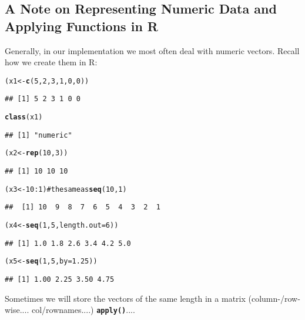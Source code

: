 \documentclass[11pt]{article}\usepackage{graphicx, color}
\makeatletter
\newcommand{\hlfunctioncall}[1]{\textcolor[rgb]{0.501960784313725,0,0.329411764705882}{\textbf{#1}}}%
\newcommand{\hlcomment}[1]{\textcolor[rgb]{0.180392156862745,0.6,0.341176470588235}{#1}}%
\newenvironment{kframe}{%
 \def\at@end@of@kframe{}%
 \ifinner\ifhmode%
  \def\at@end@of@kframe{\end{minipage}}%
  \begin{minipage}{\columnwidth}%
 \fi\fi%
 \def\FrameCommand##1{\hskip\@totalleftmargin \hskip-\fboxsep
 \colorbox{shadecolor}{##1}\hskip-\fboxsep
     \hskip-\linewidth \hskip-\@totalleftmargin \hskip\columnwidth}%
 \MakeFramed {\advance\hsize-\width
   \@totalleftmargin\z@ \linewidth\hsize
   \@setminipage}}%
 {\par\unskip\endMakeFramed%
 \at@end@of@kframe}
\newenvironment{knitrout}{}{} %
\newcommand{\lang}[1]{\textsf{#1}\xspace}
\newcommand{\R}{\lang{R}}
\newcommand{\Rfunc}[1]{\texttt{\hlfunctioncall{#1}}}
\theoremstyle{remark}
\theoremstyle{definition}
\makeatother
\begin{document}
\subsection{A Note on Representing Numeric Data and Applying Functions in \R}
Generally, in our implementation we most often deal with numeric vectors.
Recall how we create them in \R:

\begin{knitrout}\small
{}\color{fgcolor}\begin{kframe}
\begin{alltt}
(x1 <- \hlfunctioncall{c}(5, 2, 3, 1, 0, 0))
\end{alltt}
\begin{verbatim}
## [1] 5 2 3 1 0 0
\end{verbatim}
\begin{alltt}
\hlfunctioncall{class}(x1)
\end{alltt}
\begin{verbatim}
## [1] "numeric"
\end{verbatim}
\begin{alltt}
(x2 <- \hlfunctioncall{rep}(10, 3))
\end{alltt}
\begin{verbatim}
## [1] 10 10 10
\end{verbatim}
\begin{alltt}
(x3 <- 10:1) \hlcomment{# the same as \hlfunctioncall{seq}(10, 1)}
\end{alltt}
\begin{verbatim}
##  [1] 10  9  8  7  6  5  4  3  2  1
\end{verbatim}
\begin{alltt}
(x4 <- \hlfunctioncall{seq}(1, 5, length.out=6))
\end{alltt}
\begin{verbatim}
## [1] 1.0 1.8 2.6 3.4 4.2 5.0
\end{verbatim}
\begin{alltt}
(x5 <- \hlfunctioncall{seq}(1, 5, by=1.25))
\end{alltt}
\begin{verbatim}
## [1] 1.00 2.25 3.50 4.75
\end{verbatim}
\end{kframe}
\end{knitrout}


Sometimes we will store the vectors of the same length
in a matrix (column-/row-wise.... col/rownames....) \Rfunc{apply()}....
\end{document}
